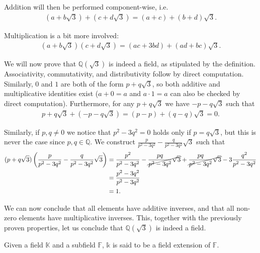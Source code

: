 \begin{exmp}
  Addition will then be performed component-wise, i.e. 
  \begin{align*}
  (a + b \sqrt 3) + (c + d \sqrt 3) = (a + c)  + (b + d) \sqrt 3.
  \end{align*}

  Multiplication is a bit more involved:
  \begin{align*}
    (a + b \sqrt 3)(c + d \sqrt 3) = (ac + 3bd) + (ad + bc) \sqrt 3.
  \end{align*}

  We will now prove that $ \mathbb{Q}(\sqrt{3})$ is indeed a field, as stipulated by the definition. Associativity,  commutativity, and distributivity follow by direct computation. Similarly, $0$ and $1$ are both of the form $p + q \sqrt 3$, so both additive and multiplicative identities exist ($a + 0 = a$ and $a \cdot 1 = a$ can also be checked by direct computation). Furthermore, for any $p + q \sqrt 3$ we have $-p -q \sqrt 3$ such that 
  \begin{align*}
    p + q\sqrt 3 + (- p - q\sqrt 3) = (p - p) + (q - q) \sqrt 3 = 0.
  \end{align*}

  Similarly, if $p, q \neq 0$ we notice that $p ^2 - 3 q ^2 = 0$ holds only if $p = q \sqrt 3$, but this is never the case since $p, q \in \mathbb{Q}$. We construct $\frac p {p ^2 - 3 q ^2 } - \frac q {p ^2 - 3 q ^2 } \sqrt 3$ such that
  \begin{align*}
    (p + q \sqrt 3)\left(\frac p {p ^2 - 3 q ^2 } - \frac q {p ^2 - 3 q ^2 } \sqrt 3\right)
    &= \frac {p ^2}  {p ^2 - 3 q ^2 } - \cancel{\frac {pq} {p ^2 - 3 q ^2 } \sqrt 3}
    + \cancel{\frac {pq}  {p ^2 - 3 q ^2 } \sqrt 3} - 3\frac {q ^2 } {p ^2 - 3 q ^2 }
    \\&= \frac{p ^2 - 3 q ^2 }{p ^2 - 3 q ^2 }
    \\&= 1.
  \end{align*}

  We can now conclude that all elements have additive inverses, and that all non-zero elements have multiplicative inverses. This, together with the previously proven properties, let us conclude that $\mathbb{Q} (\sqrt{3})$ is indeed a field.
\end{exmp}

\begin{defn}
 Given a field $\mathbb{K}$ and a subfield $\mathbb{F}$, $\mathbb{k}$ is said to be a field extension of $\mathbb{F}$.
\end{defn}

